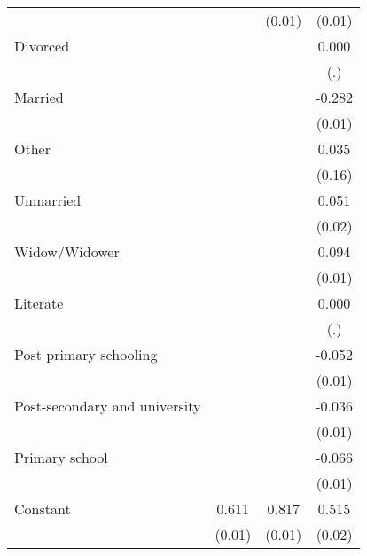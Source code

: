 {\begin{tabular}{l*{3}{c}}
                    &                     &      (0.01)         &      (0.01)         \\
Divorced            &                     &                     &       0.000         \\
                    &                     &                     &         (.)         \\
Married             &                     &                     &      -0.282\sym{***}\\
                    &                     &                     &      (0.01)         \\
Other               &                     &                     &       0.035         \\
                    &                     &                     &      (0.16)         \\
Unmarried           &                     &                     &       0.051\sym{**} \\
                    &                     &                     &      (0.02)         \\
Widow/Widower       &                     &                     &       0.094\sym{***}\\
                    &                     &                     &      (0.01)         \\
Literate            &                     &                     &       0.000         \\
                    &                     &                     &         (.)         \\
Post primary schooling&                     &                     &      -0.052\sym{***}\\
                    &                     &                     &      (0.01)         \\
Post-secondary and university&                     &                     &      -0.036\sym{**} \\
                    &                     &                     &      (0.01)         \\
Primary school      &                     &                     &      -0.066\sym{***}\\
                    &                     &                     &      (0.01)         \\
Constant            &       0.611\sym{***}&       0.817\sym{***}&       0.515\sym{***}\\
                    &      (0.01)         &      (0.01)         &      (0.02)         \\

\end{tabular}}
